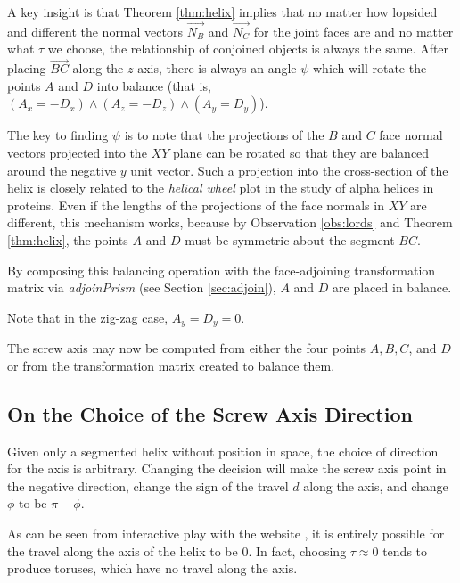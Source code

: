 \documentclass[mathematics,article,submit,pdftex,moreauthors]{Definitions/mdpi}
\newenvironment{sketch}{%
   \renewcommand{\proofname}{Proof Sketch}\proof}{\endproof}
\begin{document}
\begin{sketch}[Proof Sketch of Lemma~\ref{lem:balance}]

A key insight is that Theorem \ref{thm:helix} implies that no matter
how lopsided and different
the normal vectors  $\overrightarrow{N_B}$ and $\overrightarrow{N_C}$
for the joint faces are and no matter what $\tau$ we choose,
the relationship of conjoined objects
is always the same.
After placing $\overrightarrow{BC}$ along
the $z$-axis, there is always an angle $\psi$ which will
rotate the points $A$ and $D$ into balance (that is, $(A_x = -D_x) \wedge (A_z = -D_z) \wedge (A_y = D_y)$).

The key to finding $\psi$ is to note that
the projections of the $B$ and $C$ face normal vectors
projected into the $XY$ plane can be rotated so that they
are balanced around the negative $y$ unit vector.
Such a projection into the cross-section of the helix is closely related to
the {\em helical wheel} \cite{wiki:helicalwheel} plot
in the study of alpha helices in proteins.
Even if the lengths of the projections of the face normals in $XY$
are different, this mechanism works, because by Observation \ref{obs:lords} and Theorem \ref{thm:helix},
the points $A$ and $D$ must be symmetric about the segment $\overline{BC}$.

By composing this balancing operation with the face-adjoining transformation
matrix via {\em adjoinPrism} (see Section \ref{sec:adjoin}), $A$ and $D$ are placed in balance.

Note that in the zig-zag case, $A_y = D_y = 0$.

\end{sketch}


The screw axis may now
be computed from either the four points $A,B,C$, and $D$ or from the transformation
matrix created to balance them.

\subsection{On the Choice of the Screw Axis Direction}

Given only a segmented helix without position in space,
the choice of
direction for the axis is arbitrary.
Changing the decision will make the screw axis point in the negative direction,
change the sign of the travel $d$ along the axis, and change $\phi$ to be $\pi - \phi$.

As can be seen from interactive play with the website \cite{segmentedhelixinteractive},
it is entirely possible for the travel along
the axis of the helix to be $0$. In fact, choosing $\tau \approx 0$
tends to produce toruses, which have no
travel along the axis.
\end{document}
